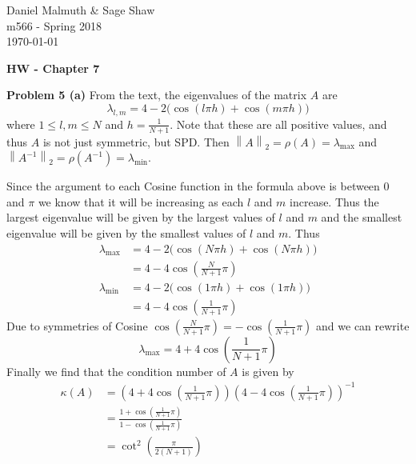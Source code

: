 \documentclass[12pt]{article}
\newcommand{\problem}[1]{\hspace{-4 ex} \large \textbf{Problem #1} }
\newcommand{\norm}[1]{\left\lVert#1\right\rVert}
\begin{document}
	\thispagestyle{empty}
	
	\begin{flushright}
		Daniel Malmuth \& Sage Shaw \\
		m566 - Spring 2018 \\
		\today
	\end{flushright}
	
{\large \textbf{HW - Chapter 7}}\bigbreak

\problem{5 (a)} From the text, the eigenvalues of the matrix $A$ are 
$$\lambda_{l,m} = 4 - 2 \big( \cos(l \pi h) + \cos(m \pi h) \big)$$
where $1 \leq l,m \leq N$ and $h = \frac{1}{N+1}$. Note that these are all positive values, and thus $A$ is not just symmetric, but SPD. Then $\norm{A}_2 = \rho(A) = \lambda_{\text{max}}$ and $\norm{A^{-1}}_2 = \rho(A^{-1}) = \lambda_{\text{min}}$. \break

Since the argument to each Cosine function in the formula above is between $0$ and $\pi$ we know that it will be increasing as each $l$ and $m$ increase. Thus the largest eigenvalue will be given by the largest values of $l$ and $m$ and the smallest eigenvalue will be given by the smallest values of $l$ and $m$. Thus 
\begin{align*}
	\lambda_\text{max} & = 4 - 2 \big( \cos(N \pi h) + \cos(N \pi h) \big) \\
	& = 4 - 4 \cos\left(\frac{N }{N+1}\pi \right) \\
	\lambda_\text{min} & = 4 - 2 \big( \cos(1 \pi h) + \cos(1 \pi h) \big) \\
	& = 4 - 4 \cos\left(\frac{1 }{N+1}\pi \right)
\end{align*}
Due to symmetries of Cosine $\cos\left(\frac{N }{N+1}\pi \right) = -\cos\left(\frac{1 }{N+1}\pi \right)$ and we can rewrite
$$
\lambda_\text{max} = 4 + 4 \cos\left(\frac{1 }{N+1}\pi \right)
$$
Finally we find that the condition number of $A$ is given by
\begin{align*}
	\kappa(A) & = \left( 4 + 4 \cos\left(\frac{1 }{N+1}\pi \right) \right) 
		\left( 4 - 4 \cos\left(\frac{1 }{N+1}\pi \right) \right)^{-1} \\
	& = \frac{1 + \cos\left(\frac{1 }{N+1}\pi \right)}{ 1 - \cos\left(\frac{1 }{N+1}\pi \right)} \\
	& = \cot^2\left(\frac{\pi }{2(N+1)} \right)
\end{align*}
\end{document}
